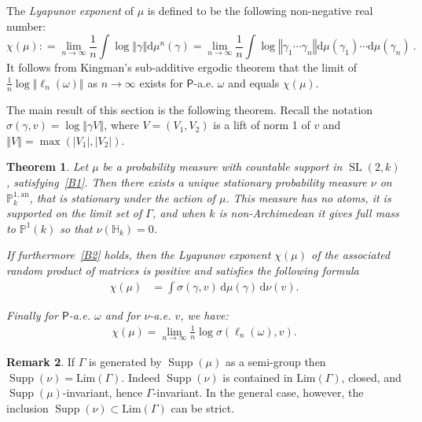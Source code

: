 \documentclass[11pt]{article}
\newtheorem{theo}{Theorem}[section]
\theoremstyle{definition}
\newtheorem{rema}[theo]{Remark}
\numberwithin{equation}{section}
\numberwithin{figure}{section}
\numberwithin{table}{section}
\DeclareMathOperator{\supp}{Supp}
\DeclareMathOperator{\SL}{SL}
\newcommand{\hh}{\mathbb{H}}
\newcommand{\prob}{\mathsf{P}}
\newcommand{\norm}[1]{\left\Vert#1\right\Vert}
\newcommand{\abs}[1]{\left\vert#1\right\vert}
\newcommand{\PP}{\mathbb{P}}
\newcommand{\berk}{{\mathbb{P}^{1, \mathrm{an}}_k}}
\newcommand{\SLk}{\SL(2,k)}
\newcommand*{\dd}{\mathrm{d}}
\newcommand*{\dmu}{\dd \mu}
\newcommand*{\dnu}{\dd \nu}
\begin{document}
The \emph{Lyapunov exponent} of $\mu$ is defined to be the following non-negative real number:
\begin{equation}\label{def:lyapunov exponent}
\chi (\mu) : = \lim _{n\rightarrow \infty} \frac{1}{n}\int
\log \norm{\gamma} \dmu^{n}(\gamma) = \lim _{n\rightarrow \infty} \frac{1}{n}\int \log \norm{ \gamma_1\cdots
\gamma_n} \dmu(\gamma_1)\cdots \dmu(\gamma_n)~.
\end{equation}
It follows from Kingman's sub-additive ergodic theorem that the limit of $ \frac1n \log \norm {\ell_n(\omega)}$ as $n\to\infty$ exists for $\prob$-a.e. $\omega$ and equals $\chi(\mu)$.


The main result of this section is the following theorem. Recall the notation $\sigma(\gamma, v) = \log\norm{\gamma V}$, where $V = (V_1, V_2)$ is a lift of norm 1 of $v$ and $\norm{V} = \max(\abs{V_1}, \abs{V_2})$.

\begin{theo}\label{thm:positive}
Let $\mu$ be a probability measure with countable support in $\SLk$, satisfying~\eqref{B1}. Then there exists a unique stationary probability measure $\nu$ on $\berk$, that is stationary under the action of $\mu$. This measure has no atoms, it is supported on the limit set of $\Gamma$, and when $k$ is non-Archimedean it gives full mass to $\PP^1(k)$ so that $\nu (\hh_k)=0$.

If furthermore~\eqref{B2} holds, then the Lyapunov exponent $\chi(\mu)$ of the associated random product of matrices is positive and satisfies the following formula
\begin{align}\label{eq:furstenberg}
\chi(\mu) & = \int \sigma(\gamma, v) \, \dmu(\gamma)\, \dnu(v).
\end{align}

Finally for $\prob$-a.e. $\omega$ and for $\nu$-a.e. $v$, we have:
\begin{align}
\chi(\mu) = \lim_{n\to\infty} \frac1n \log \sigma(\ell_n(\omega), v) \label{eq301}
.
\end{align}
\end{theo}

\begin{rema}
If $\Gamma$ is generated by $\supp(\mu)$ as a semi-group then $\supp(\nu) = \mathrm{Lim}(\Gamma)$. Indeed $\supp(\nu)$ is contained in $\mathrm{Lim}(\Gamma)$, closed, and $\supp(\mu)$-invariant, hence $\Gamma$-invariant. In the general case, however, the inclusion $\supp(\nu)\subset \mathrm{Lim}(\Gamma)$ can be strict.
\end{rema}
\end{document}

